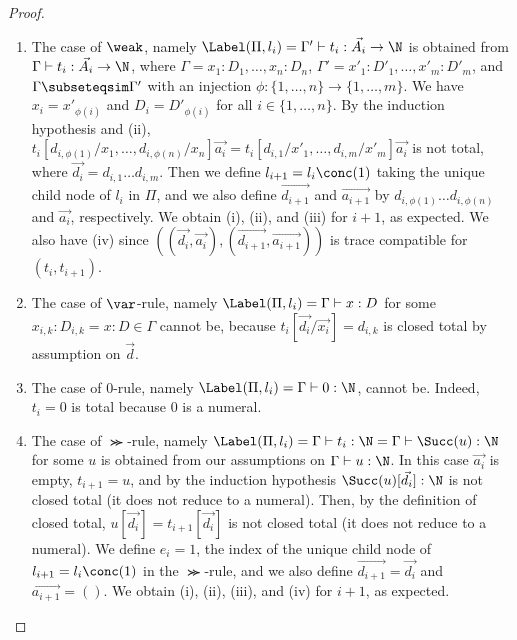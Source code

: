 \begin{proof}

\begin{enumerate}
\item
  The case of $\weak$, namely
  $\Label(\Pi,l_i) = \Gamma'\vdash t_i:\vec{A_i}\rightarrow\N$
  is obtained from $\Gamma\vdash t_i:\vec{A_i}\rightarrow\N$, where
  $\Gamma = x_1:D_1,\ldots,x_n:D_n$, $\Gamma' = x'_1:D'_1,\ldots,x'_m:D'_m$, and $\Gamma \subseteqsim \Gamma'$
  with an injection $\phi:\{1,\ldots,n\}\to\{1,\ldots,m\}$. 
  We have $x_i = x'_{\phi(i)}$ and $D_i = D'_{\phi(i)}$ for all $i \in \{1,\ldots,n\}$.
  By the induction hypothesis and (ii), 
  $t_i[d_{i,\phi(1)}/x_1,\ldots,d_{i,\phi(n)}/x_n]\vec{a_i} 
   = t_i[d_{i,1}/x'_1,\ldots,d_{i,m}/x'_m]\vec{a_i}$ is not total,
  where $\vec{d_i} = d_{i,1}\ldots d_{i,m}$.
  Then we define $l_{i+1} = l_i\conc(1)$ taking the unique child node of $l_i$ in $\Pi$, and we
  also define $\vec{d_{i+1}}$ and $\vec{a_{i+1}}$ by $d_{i,\phi(1)}\ldots d_{i,\phi(n)}$
  and $\vec{a_i}$, respectively. 
  We obtain (i), (ii), and (iii) for $i+1$, as expected.
  We also have (iv) since $((\vec{d_i},\vec{a_i}),(\vec{d_{i+1}},\vec{a_{i+1}}))$
  is trace compatible for $(t_i,t_{i+1})$. 

\item
  The case of $\var$-rule, namely $\Label(\Pi,l_i) = \Gamma\vdash x:D$ for some $x_{i,k}:D_{i,k} = x:D \in \Gamma$
  cannot be, because $t_i [\vec{d_i}/\vec{x_i}] = d_{i,k}$ is closed total by assumption on $\vec{d}$.
  
\item
  The case of $0$-rule, namely $\Label(\Pi,l_i) = \Gamma\vdash 0:\N$, 
cannot be. Indeed, $t_i = 0$ is total because $0$ is a numeral.

\item  
  The case of $\Succ$-rule, namely $\Label(\Pi,l_i) = \Gamma\vdash t_i: \N = \Gamma\vdash \Succ(u): \N$
  for some $u$ is obtained from our assumptions on
  $\Gamma\vdash u: \N$. In this case $\vec{a_i}$ is empty, $t_{i+1}=u$, and
  by the induction hypothesis $\Succ(u)[\vec{d_i}]:\N$ is not closed total (it does not reduce to a numeral).
  Then, by the definition of closed total, $u[\vec{d_i}] =t_{i+1}[\vec{d_i}] $ is not closed total
 (it does not reduce to a numeral).
  We define $e_{i}=1$, 
  the index of the unique child node of $l_{i+1}=l_i\conc(1)$ in the $\Succ$-rule, and
  we also define $\vec{d_{i+1}} = \vec{d_i}$ and $\vec{a_{i+1}} = ()$. 
  We obtain (i), (ii), (iii), and (iv) for $i+1$, as expected.


\end{enumerate}
\end{proof}
